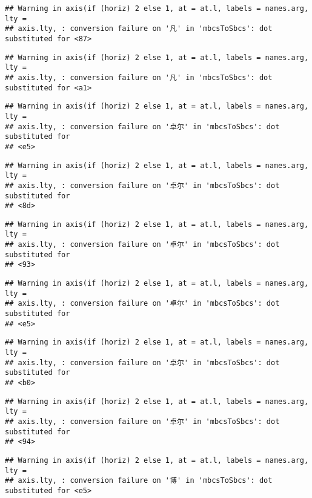 \documentclass[
]{article}
\begin{document}
\begin{verbatim}
## Warning in axis(if (horiz) 2 else 1, at = at.l, labels = names.arg, lty =
## axis.lty, : conversion failure on '凡' in 'mbcsToSbcs': dot substituted for <87>
\end{verbatim}

\begin{verbatim}
## Warning in axis(if (horiz) 2 else 1, at = at.l, labels = names.arg, lty =
## axis.lty, : conversion failure on '凡' in 'mbcsToSbcs': dot substituted for <a1>
\end{verbatim}

\begin{verbatim}
## Warning in axis(if (horiz) 2 else 1, at = at.l, labels = names.arg, lty =
## axis.lty, : conversion failure on '卓尔' in 'mbcsToSbcs': dot substituted for
## <e5>
\end{verbatim}

\begin{verbatim}
## Warning in axis(if (horiz) 2 else 1, at = at.l, labels = names.arg, lty =
## axis.lty, : conversion failure on '卓尔' in 'mbcsToSbcs': dot substituted for
## <8d>
\end{verbatim}

\begin{verbatim}
## Warning in axis(if (horiz) 2 else 1, at = at.l, labels = names.arg, lty =
## axis.lty, : conversion failure on '卓尔' in 'mbcsToSbcs': dot substituted for
## <93>
\end{verbatim}

\begin{verbatim}
## Warning in axis(if (horiz) 2 else 1, at = at.l, labels = names.arg, lty =
## axis.lty, : conversion failure on '卓尔' in 'mbcsToSbcs': dot substituted for
## <e5>
\end{verbatim}

\begin{verbatim}
## Warning in axis(if (horiz) 2 else 1, at = at.l, labels = names.arg, lty =
## axis.lty, : conversion failure on '卓尔' in 'mbcsToSbcs': dot substituted for
## <b0>
\end{verbatim}

\begin{verbatim}
## Warning in axis(if (horiz) 2 else 1, at = at.l, labels = names.arg, lty =
## axis.lty, : conversion failure on '卓尔' in 'mbcsToSbcs': dot substituted for
## <94>
\end{verbatim}

\begin{verbatim}
## Warning in axis(if (horiz) 2 else 1, at = at.l, labels = names.arg, lty =
## axis.lty, : conversion failure on '博' in 'mbcsToSbcs': dot substituted for <e5>
\end{verbatim}
\end{document}
